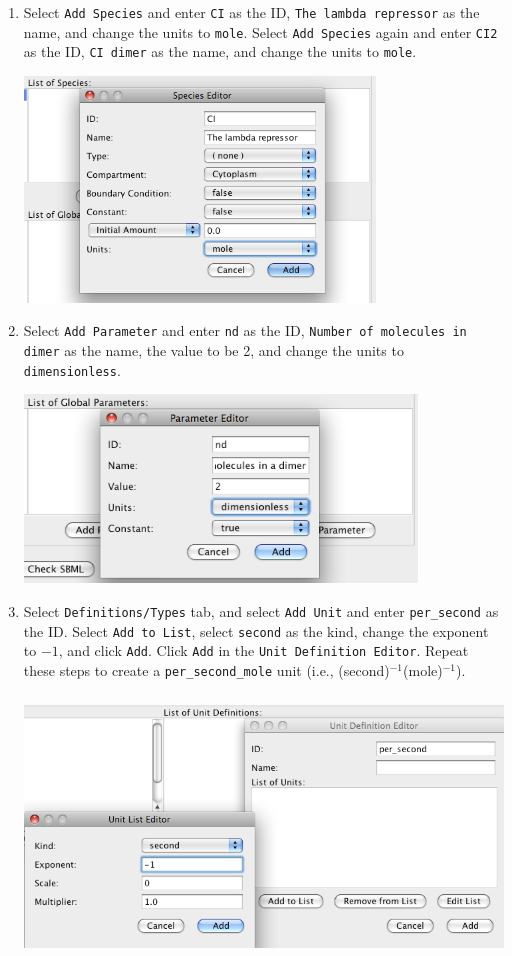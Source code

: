 \documentclass[titlepage,11pt]{article}
\begin{document}
\begin{enumerate}
\item Select {\tt Add Species} and enter {\tt CI} as the ID, 
{\tt The lambda repressor} as the name, and change the units 
to {\tt mole}.  Select {\tt Add Species} again and enter {\tt CI2} as the ID,
{\tt CI dimer} as the name, and change the units to {\tt mole}.

\includegraphics[height=60mm]{screenshots/species}

\item Select {\tt Add Parameter} and enter {\tt nd} as the ID,
      {\tt Number of molecules in dimer} as the name, the value to be 2,
      and change the units to {\tt dimensionless}.

\includegraphics[height=50mm]{screenshots/parameter}

\item Select {\tt Definitions/Types} tab, and select {\tt Add Unit}
      and enter {\tt per\_second} as the ID.  Select {\tt Add to List}, 
      select {\tt second} as the kind, change the exponent to $-1$, 
      and click {\tt Add}.  Click {\tt Add} in the {\tt Unit Definition Editor}.
      Repeat these steps to create a {\tt per\_second\_mole} unit 
      (i.e., (second)$^{-1}$(mole)$^{-1}$).

\includegraphics[height=70mm]{screenshots/units}


\end{enumerate}
\end{document}
